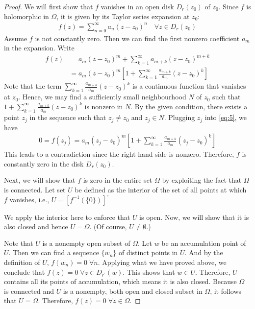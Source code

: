 \documentclass[thmcnt=section, color=cyan, 12pt]{my-elegantbook}
\begin{document}
\begin{proof}
    We will first show that $f$ vanishes in an open disk $D_r(z_0)$ of $z_0$.
    Since $f$ is holomorphic in $\Omega$, it is given by its Taylor series expansion at $z_0$:
    \begin{align*}
        f(z) = \sum_{n=0}^\infty a_n  (z - z_0)^n \quad \forall z \in D_r(z_0)
    \end{align*}
    Assume $f$ is not constantly zero.
    Then we can find the first nonzero coefficient $a_m$ in the expansion.
    Write
    \begin{align}
        f(z) & = a_m(z - z_0)^m + \sum_{k=1}^\infty a_{m+k}  (z - z_0)^{m+k} \nonumber \\
             & = a_m(z - z_0)^m \left[
            1 + \sum_{k=1}^\infty \frac{a_{m+k}}{a_m}  (z - z_0)^{k}
            \right]
        \label{eq:5}
    \end{align}
    Note that the term $\sum_{k=1}^\infty \frac{a_{m+k}}{a_m}  (z - z_0)^{k}$ is a continuous function that vanishes at $z_0$.
    Hence, we may find a sufficiently small neighbourhood $N$ of $z_0$ such that $1 + \sum_{k=1}^\infty \frac{a_{m+k}}{a_m}  (z - z_0)^{k}$ is nonzero in $N$.
    By the given condition, there exists a point $z_j$ in the sequence such that $z_j \neq z_0$ and $z_j \in N$.
    Plugging $z_j$ into \eqref{eq:5}, we have
    \begin{align*}
        0 = f(z_j) = a_m(z_j - z_0)^m \left[
            1 + \sum_{k=1}^\infty \frac{a_{m+k}}{a_m}  (z_j - z_0)^{k}
            \right]
    \end{align*}
    This leads to a contradiction since the right-hand side is nonzero.
    Therefore, $f$ is constantly zero in the disk $D_r(z_0)$.

    Next, we will show that $f$ is zero in the entire set $\Omega$ by exploiting the fact that $\Omega$ is connected.
    Let set $U$ be defined as the interior of the set of all points at which $f$ vanishes, i.e., $U = [f^{-1}(\{0\})]^\circ$
    \begin{note}
        We apply the interior here to enforce that $U$ is open. Now, we will show that it is also closed and hence $U = \Omega$. (Of course, $U \neq \emptyset$.)
    \end{note}

    Note that $U$ is a nonempty open subset of $\Omega$.
    Let $w$ be an accumulation point of $U$.
    Then we can find a sequence $\{w_n\}$ of distinct points in $U$.
    And by the definition of $U$, $f(w_n) = 0 \; \forall n$.
    Applying what we have proved above, we conclude that $f(z) = 0 \; \forall z \in D_{r^\prime} (w)$.
    This shows that $w \in U$.
    Therefore, $U$ contains all its points of accumulation, which means it is also closed.
    Because $\Omega$ is connected and $U$ is a nonempty, both open and closed subset in $\Omega$, it follows that $U = \Omega$.
    Therefore, $f(z) = 0 \; \forall z \in \Omega$.
\end{proof}




\printbibliography[heading=bibintoc, title=References]


\printindex
\end{document}

